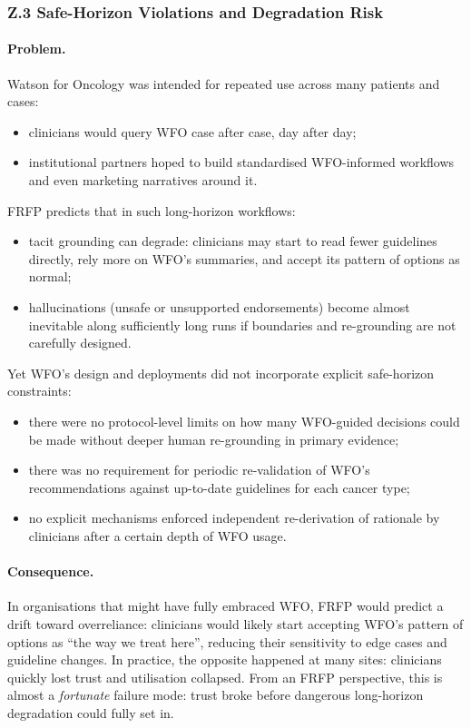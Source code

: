 \subsubsection*{Z.3 Safe-Horizon Violations and Degradation Risk}

\paragraph{Problem.}
Watson for Oncology was intended for repeated use across many patients and
cases:

\begin{itemize}
  \item clinicians would query WFO case after case, day after day;
  \item institutional partners hoped to build standardised WFO-informed
        workflows and even marketing narratives around it.
\end{itemize}

FRFP predicts that in such long-horizon workflows:

\begin{itemize}
  \item tacit grounding can degrade: clinicians may start to read fewer
        guidelines directly, rely more on WFO’s summaries, and accept its
        pattern of options as normal;
  \item hallucinations (unsafe or unsupported endorsements) become almost
        inevitable along sufficiently long runs if boundaries and re-grounding
        are not carefully designed.
\end{itemize}

Yet WFO’s design and deployments did not incorporate explicit safe-horizon
constraints:

\begin{itemize}
  \item there were no protocol-level limits on how many WFO-guided decisions
        could be made without deeper human re-grounding in primary evidence;
  \item there was no requirement for periodic re-validation of WFO’s
        recommendations against up-to-date guidelines for each cancer type;
  \item no explicit mechanisms enforced independent re-derivation of
        rationale by clinicians after a certain depth of WFO usage.
\end{itemize}

\paragraph{Consequence.}
In organisations that might have fully embraced WFO, FRFP would predict a
drift toward overreliance:
clinicians would likely start accepting WFO’s pattern of options as
``the way we treat here'', reducing their sensitivity to edge cases and
guideline changes.
In practice, the opposite happened at many sites: clinicians quickly lost
trust and utilisation collapsed.
From an FRFP perspective, this is almost a \emph{fortunate} failure mode:
trust broke before dangerous long-horizon degradation could fully set in.

